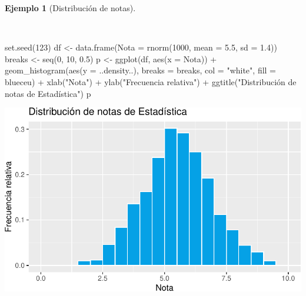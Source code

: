 \documentclass[
  a4paper,
]{scrreport}
\newenvironment{Shaded}{\begin{snugshade}}{\end{snugshade}}
\newcommand{\AttributeTok}[1]{\textcolor[rgb]{0.40,0.45,0.13}{#1}}
\newcommand{\DecValTok}[1]{\textcolor[rgb]{0.68,0.00,0.00}{#1}}
\newcommand{\FloatTok}[1]{\textcolor[rgb]{0.68,0.00,0.00}{#1}}
\newcommand{\FunctionTok}[1]{\textcolor[rgb]{0.28,0.35,0.67}{#1}}
\newcommand{\NormalTok}[1]{\textcolor[rgb]{0.00,0.23,0.31}{#1}}
\newcommand{\OtherTok}[1]{\textcolor[rgb]{0.00,0.23,0.31}{#1}}
\newcommand{\SpecialCharTok}[1]{\textcolor[rgb]{0.37,0.37,0.37}{#1}}
\newcommand{\StringTok}[1]{\textcolor[rgb]{0.13,0.47,0.30}{#1}}
\theoremstyle{plain}
\theoremstyle{definition}
\theoremstyle{definition}
\newtheorem{example}{Ejemplo}[chapter]
\theoremstyle{remark}
\begin{document}
\begin{example}[Distribución de
notas]\protect\hypertarget{exm-distribucion-notas}{}\label{exm-distribucion-notas}

~

\begin{Shaded}
\begin{Highlighting}[]
\FunctionTok{set.seed}\NormalTok{(}\DecValTok{123}\NormalTok{)}
\NormalTok{df }\OtherTok{\textless{}{-}} \FunctionTok{data.frame}\NormalTok{(}\AttributeTok{Nota =} \FunctionTok{rnorm}\NormalTok{(}\DecValTok{1000}\NormalTok{, }\AttributeTok{mean =} \FloatTok{5.5}\NormalTok{, }\AttributeTok{sd =} \FloatTok{1.4}\NormalTok{))}
\NormalTok{breaks }\OtherTok{\textless{}{-}} \FunctionTok{seq}\NormalTok{(}\DecValTok{0}\NormalTok{, }\DecValTok{10}\NormalTok{, }\FloatTok{0.5}\NormalTok{)}
\NormalTok{p }\OtherTok{\textless{}{-}} \FunctionTok{ggplot}\NormalTok{(df, }\FunctionTok{aes}\NormalTok{(}\AttributeTok{x =}\NormalTok{ Nota)) }\SpecialCharTok{+}
    \FunctionTok{geom\_histogram}\NormalTok{(}\FunctionTok{aes}\NormalTok{(}\AttributeTok{y =}\NormalTok{ ..density..), }\AttributeTok{breaks =}\NormalTok{ breaks, }\AttributeTok{col =} \StringTok{"white"}\NormalTok{, }\AttributeTok{fill =}\NormalTok{ blueceu) }\SpecialCharTok{+}
    \FunctionTok{xlab}\NormalTok{(}\StringTok{"Nota"}\NormalTok{) }\SpecialCharTok{+}
    \FunctionTok{ylab}\NormalTok{(}\StringTok{"Frecuencia relativa"}\NormalTok{) }\SpecialCharTok{+}
    \FunctionTok{ggtitle}\NormalTok{(}\StringTok{"Distribución de notas de Estadística"}\NormalTok{)}
\NormalTok{p}
\end{Highlighting}
\end{Shaded}

\includegraphics{02-estadistica-descriptiva_files/figure-pdf/histograma-notas-1.pdf}

\end{example}
\end{document}
